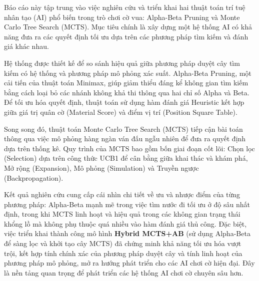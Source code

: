 Báo cáo này tập trung vào việc nghiên cứu và triển khai hai thuật toán trí tuệ nhân tạo (AI) phổ biến trong trò chơi cờ vua: Alpha-Beta Pruning và Monte Carlo Tree Search (MCTS). Mục tiêu chính là xây dựng một hệ thống AI có khả năng đưa ra các quyết định tối ưu dựa trên các phương pháp tìm kiếm và đánh giá khác nhau.

Hệ thống được thiết kế để so sánh hiệu quả giữa phương pháp duyệt cây tìm kiếm có hệ thống và phương pháp mô phỏng xác suất. Alpha-Beta Pruning, một cải tiến của thuật toán Minimax, giúp giảm thiểu đáng kể không gian tìm kiếm bằng cách loại bỏ các nhánh không khả thi thông qua hai chỉ số Alpha và Beta. Để tối ưu hóa quyết định, thuật toán sử dụng hàm đánh giá Heuristic kết hợp giữa giá trị quân cờ (Material Score) và điểm vị trí (Position Square Table).

Song song đó, thuật toán Monte Carlo Tree Search (MCTS) tiếp cận bài toán thông qua việc mô phỏng hàng ngàn ván đấu ngẫu nhiên để đưa ra quyết định dựa trên thống kê. Quy trình của MCTS bao gồm bốn giai đoạn cốt lõi: Chọn lọc (Selection) dựa trên công thức UCB1 để cân bằng giữa khai thác và khám phá, Mở rộng (Expansion), Mô phỏng (Simulation) và Truyền ngược (Backpropagation). 

Kết quả nghiên cứu cung cấp cái nhìn chi tiết về ưu và nhược điểm của từng phương pháp: Alpha-Beta mạnh mẽ trong việc tìm nước đi tối ưu ở độ sâu nhất định, trong khi MCTS linh hoạt và hiệu quả trong các không gian trạng thái khổng lồ mà không phụ thuộc quá nhiều vào hàm đánh giá thủ công. Đặc biệt, việc triển khai thành công mô hình \textbf{Hybrid MCTS+AB} (sử dụng Alpha-Beta để sàng lọc và khởi tạo cây MCTS) đã chứng minh khả năng tối ưu hóa vượt trội, kết hợp tính chính xác của phương pháp duyệt cây và tính linh hoạt của phương pháp mô phỏng, mở ra hướng phát triển cho các AI chơi cờ hiện đại. Đây là nền tảng quan trọng để phát triển các hệ thống AI chơi cờ chuyên sâu hơn.
